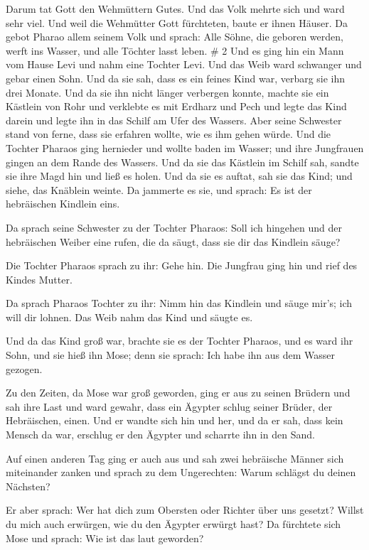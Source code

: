  Darum tat Gott den Wehmüttern Gutes. Und das Volk mehrte
sich und ward sehr viel.  Und weil die Wehmütter Gott
fürchteten, baute er ihnen Häuser.  Da gebot Pharao allem
seinem Volk und sprach: Alle Söhne, die geboren werden, werft ins
Wasser, und alle Töchter lasst leben. \# 2  Und es ging hin
ein Mann vom Hause Levi und nahm eine Tochter Levi.  Und das
Weib ward schwanger und gebar einen Sohn. Und da sie sah, dass es ein
feines Kind war, verbarg sie ihn drei Monate.  Und da sie
ihn nicht länger verbergen konnte, machte sie ein Kästlein von Rohr und
verklebte es mit Erdharz und Pech und legte das Kind darein und legte
ihn in das Schilf am Ufer des Wassers.  Aber seine Schwester
stand von ferne, dass sie erfahren wollte, wie es ihm gehen würde.
 Und die Tochter Pharaos ging hernieder und wollte baden im
Wasser; und ihre Jungfrauen gingen an dem Rande des Wassers. Und da sie
das Kästlein im Schilf sah, sandte sie ihre Magd hin und ließ es holen.
 Und da sie es auftat, sah sie das Kind; und siehe, das
Knäblein weinte. Da jammerte es sie, und sprach: Es ist der hebräischen
Kindlein eins.

 Da sprach seine Schwester zu der Tochter Pharaos: Soll ich
hingehen und der hebräischen Weiber eine rufen, die da säugt, dass sie
dir das Kindlein säuge?

 Die Tochter Pharaos sprach zu ihr: Gehe hin. Die Jungfrau
ging hin und rief des Kindes Mutter.

 Da sprach Pharaos Tochter zu ihr: Nimm hin das Kindlein und
säuge mir's; ich will dir lohnen. Das Weib nahm das Kind und säugte es.

 Und da das Kind groß war, brachte sie es der Tochter
Pharaos, und es ward ihr Sohn, und sie hieß ihn Mose; denn sie sprach:
Ich habe ihn aus dem Wasser gezogen.

 Zu den Zeiten, da Mose war groß geworden, ging er aus zu
seinen Brüdern und sah ihre Last und ward gewahr, dass ein Ägypter
schlug seiner Brüder, der Hebräischen, einen.  Und er
wandte sich hin und her, und da er sah, dass kein Mensch da war,
erschlug er den Ägypter und scharrte ihn in den Sand.

 Auf einen anderen Tag ging er auch aus und sah zwei
hebräische Männer sich miteinander zanken und sprach zu dem Ungerechten:
Warum schlägst du deinen Nächsten?

 Er aber sprach: Wer hat dich zum Obersten oder Richter
über uns gesetzt? Willst du mich auch erwürgen, wie du den Ägypter
erwürgt hast? Da fürchtete sich Mose und sprach: Wie ist das laut
geworden?


